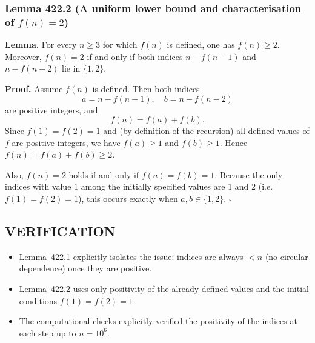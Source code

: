 \subsubsection*{Lemma 422.2 (A uniform lower bound and characterisation of $f(n)=2$)}
\textbf{Lemma.} For every $n\ge 3$ for which $f(n)$ is defined, one has $f(n)\ge 2$.
Moreover, $f(n)=2$ if and only if both indices $n-f(n-1)$ and $n-f(n-2)$ lie in $\{1,2\}$.

\textbf{Proof.}
Assume $f(n)$ is defined. Then both indices
\[
a=n-f(n-1),\quad b=n-f(n-2)
\]
are positive integers, and
\[
f(n)=f(a)+f(b).
\]
Since $f(1)=f(2)=1$ and (by definition of the recursion) all defined values of $f$ are positive integers, we have $f(a)\ge 1$ and $f(b)\ge 1$. Hence $f(n)=f(a)+f(b)\ge 2$.

Also, $f(n)=2$ holds if and only if $f(a)=f(b)=1$.
Because the only indices with value $1$ among the initially specified values are $1$ and $2$ (i.e. $f(1)=f(2)=1$), this occurs exactly when $a,b\in\{1,2\}$.
\hfill$\square$

\subsection*{VERIFICATION}
\begin{itemize}
\item Lemma~422.1 explicitly isolates the issue: indices are always $<n$ (no circular dependence) once they are positive.
\item Lemma~422.2 uses only positivity of the already-defined values and the initial conditions $f(1)=f(2)=1$.
\item The computational checks explicitly verified the positivity of the indices at each step up to $n=10^6$.
\end{itemize}

